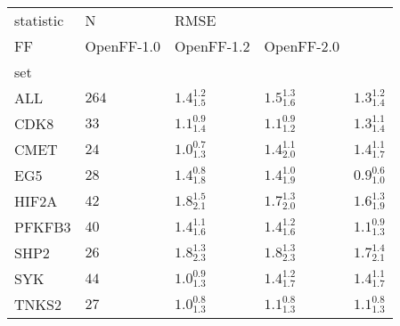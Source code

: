 \begin{tabular}{lllll}
\toprule
statistic &      N & \multicolumn{3}{l}{RMSE} \\
FF &         OpenFF-1.0 &         OpenFF-1.2 &         OpenFF-2.0 \\
set    &        &                    &                    &                    \\
\midrule
ALL    &  $264$ &  $1.4^{1.2}_{1.5}$ &  $1.5^{1.3}_{1.6}$ &  $1.3^{1.2}_{1.4}$ \\
CDK8   &   $33$ &  $1.1^{0.9}_{1.4}$ &  $1.1^{0.9}_{1.2}$ &  $1.3^{1.1}_{1.4}$ \\
CMET   &   $24$ &  $1.0^{0.7}_{1.3}$ &  $1.4^{1.1}_{2.0}$ &  $1.4^{1.1}_{1.7}$ \\
EG5    &   $28$ &  $1.4^{0.8}_{1.8}$ &  $1.4^{1.0}_{1.9}$ &  $0.9^{0.6}_{1.0}$ \\
HIF2A  &   $42$ &  $1.8^{1.5}_{2.1}$ &  $1.7^{1.3}_{2.0}$ &  $1.6^{1.3}_{1.9}$ \\
PFKFB3 &   $40$ &  $1.4^{1.1}_{1.6}$ &  $1.4^{1.2}_{1.6}$ &  $1.1^{0.9}_{1.3}$ \\
SHP2   &   $26$ &  $1.8^{1.3}_{2.3}$ &  $1.8^{1.3}_{2.3}$ &  $1.7^{1.4}_{2.1}$ \\
SYK    &   $44$ &  $1.0^{0.9}_{1.3}$ &  $1.4^{1.2}_{1.7}$ &  $1.4^{1.1}_{1.7}$ \\
TNKS2  &   $27$ &  $1.0^{0.8}_{1.3}$ &  $1.1^{0.8}_{1.3}$ &  $1.1^{0.8}_{1.3}$ \\
\bottomrule
\end{tabular}
